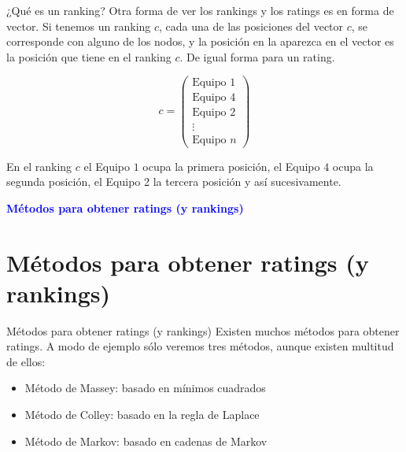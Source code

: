 \documentclass[10pt,hyperref={unicode}]{beamer}
\begin{document}
	\begin{frame}{¿Qué es un ranking?}
		Otra forma de ver los rankings y los ratings es en forma de vector. Si tenemos un ranking $c$, cada una de las posiciones del vector $c$, se corresponde con alguno de los nodos, y la posición en la aparezca en el vector es la posición que tiene en el ranking $c$. De igual forma para un rating.
		
		\begin{ejemplo}
			$$ c = \left(
			\begin{array}{c}
			\text{Equipo } 1 \\
			\text{Equipo } 4 \\
			\text{Equipo } 2 \\
			\vdots \\
			\text{Equipo } n
			\end{array}
			\right) $$
				
			En el ranking $c$ el Equipo $1$ ocupa la primera posición, el Equipo $4$ ocupa la segunda posición, el Equipo 2 la tercera posición y así sucesivamente.
			
		\end{ejemplo}
	\end{frame}
	
	\begin{frame}
		\begin{center}
			\Huge\textbf{\textsf{\textcolor{blue}{Métodos para obtener ratings (y rankings)}}}
		\end{center}
	\end{frame}
	
	\section{Métodos para obtener ratings (y rankings)}
	
	\begin{frame}{Métodos para obtener ratings (y rankings)}
		Existen muchos métodos para obtener ratings. A modo de ejemplo sólo veremos tres métodos, aunque existen multitud de ellos:
		
		\begin{itemize}
			\item Método de Massey: basado en mínimos cuadrados
			\item Método de Colley: basado en la regla de Laplace
			\item Método de Markov: basado en cadenas de Markov
		\end{itemize}
	\end{frame}
	
\end{document}
